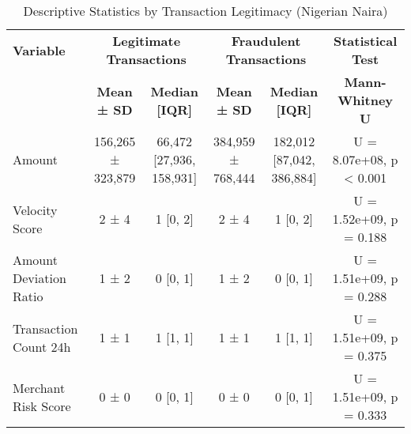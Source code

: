 \begin{table}[ht]
    \centering
    \caption{Descriptive Statistics by Transaction Legitimacy (Nigerian Naira)}
    \label{tab:descriptive_stats}
    \begin{tabular}{|l|c|c|c|c|c|}
        \hline
        \textbf{Variable} & \multicolumn{2}{c|}{\textbf{Legitimate Transactions}} & \multicolumn{2}{c|}{\textbf{Fraudulent Transactions}} & \textbf{Statistical Test} \\
        & \textbf{Mean ± SD} & \textbf{Median [IQR]} & \textbf{Mean ± SD} & \textbf{Median [IQR]} & \textbf{Mann-Whitney U} \\
        \hline
        Amount & 156,265 ± 323,879 & 66,472 [27,936, 158,931] & 384,959 ± 768,444 & 182,012 [87,042, 386,884] & U = 8.07e+08, p < 0.001 \\
        Velocity Score & 2 ± 4 & 1 [0, 2] & 2 ± 4 & 1 [0, 2] & U = 1.52e+09, p = 0.188 \\
        Amount Deviation Ratio & 1 ± 2 & 0 [0, 1] & 1 ± 2 & 0 [0, 1] & U = 1.51e+09, p = 0.288 \\
        Transaction Count 24h & 1 ± 1 & 1 [1, 1] & 1 ± 1 & 1 [1, 1] & U = 1.51e+09, p = 0.375 \\
        Merchant Risk Score & 0 ± 0 & 0 [0, 1] & 0 ± 0 & 0 [0, 1] & U = 1.51e+09, p = 0.333 \\
        \hline
    \end{tabular}
\end{table}